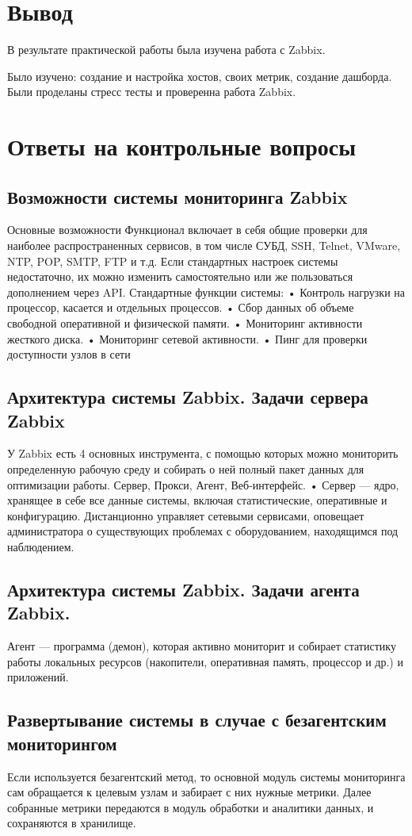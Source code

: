 \clearpage

\section*{\LARGE Вывод}
В результате практической работы была изучена работа
с Zabbix.\par
Было изучено: создание и настройка хостов, своих метрик, создание дашборда.
Были проделаны стресс тесты и проверенна работа Zabbix.

\clearpage

\section{Ответы на контрольные вопросы}
\subsection{Возможности системы мониторинга Zabbix}
Основные возможности
Функционал включает в себя общие проверки для наиболее распространенных
сервисов, в том числе СУБД, SSH, Telnet, VMware, NTP, POP, SMTP, FTP и
т.д. Если стандартных настроек системы недостаточно, их можно изменить
самостоятельно или же пользоваться дополнением через API.
Стандартные функции системы:
• Контроль нагрузки на процессор, касается и отдельных процессов.
• Сбор данных об объеме свободной оперативной и физической памяти.
• Мониторинг активности жесткого диска.
• Мониторинг сетевой активности.
• Пинг для проверки доступности узлов в сети

\subsection{Архитектура системы Zabbix. Задачи сервера Zabbix}
У Zabbix есть 4 основных инструмента, с помощью которых можно
мониторить определенную рабочую среду и собирать о ней полный пакет
данных для оптимизации работы.
Сервер, Прокси, Агент, Веб-интерфейс.
• Сервер — ядро, хранящее в себе все данные системы, включая
статистические, оперативные и конфигурацию. Дистанционно управляет
сетевыми сервисами, оповещает администратора о существующих проблемах
с оборудованием, находящимся под наблюдением.
\subsection{Архитектура системы Zabbix. Задачи агента Zabbix.}
Агент — программа (демон), которая активно мониторит и собирает
статистику работы локальных ресурсов (накопители, оперативная память,
процессор и др.) и приложений.

\subsection{Развертывание системы в случае с безагентским мониторингом}
Если используется безагентский
метод, то основной модуль системы мониторинга сам обращается к целевым
узлам и забирает с них нужные метрики.
Далее собранные метрики
передаются в модуль обработки и аналитики данных, и сохраняются в
хранилище.
